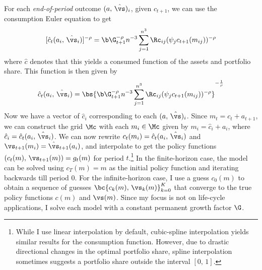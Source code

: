 For each \textit{end-of-period} outcome $(a,\,\hat{\vs})_i$, given $c_{t+1}$, we can use the consumption Euler equation to get
\[
[\hat{c}_t(a_i,\,\hat{\vs}_i)]^{-\rho} = \b\G_{t+1}^{-\rho} n^{-3}\sum_{j=1}^{n^3}\Rc_{ij}(\psi_{j}c_{t+1}(m_{ij}))^{-\rho}
\]
where $\hat{c}$ denotes that this yields a consumed function of the assets and portfolio share.
This function is then given by
\[
\hat{c}_{t}(a_i,\,\hat{\vs}_i) = \bs{\b\G_{t+1}^{-\rho}n^{-3}\sum_{j=1}^{n^3}\Rc_{ij}(\psi_{j}c_{t+1}(m_{ij}))^{-\rho}}^{-\frac{1}{\rho}}
\]
Now we have a vector of $\hat{c}_i$ corresponding to each $(a,\,\hat{\vs})_i$. Since $m_{t} = c_{t} + a_{t+1}$, we can construct the grid $\Mc$ with each $m_i \in \Mc$ given by $m_i = \hat{c}_i + a_i$, where $\hat{c}_{i} = \hat{c}_{t}(a_i,\,\hat{\vs}_i)$. We can now rewrite $c_t(m_i) = \hat{c}_t(a_i,\,\hat{\vs}_i)$ and $\vs_{t+1}(m_i) = \hat{\vs}_{t+1}(a_i)$, and interpolate to get the policy functions $(c_{t}(m),\,\vs_{t+1}(m)) = g_{t}(m)$ for period $t$.\footnote{While I use linear interpolation by default, cubic-spline interpolation yields similar results for the consumption function. However, due to drastic directional changes in the optimal portfolio share, spline interpolation sometimes suggests a portfolio share outside the interval $[0,\,1]$.} In the finite-horizon case, the model can be solved using $c_{T}(m) = m$ as the initial policy function and iterating backwards till period 0. For the infinite-horizon case, I use a guess $c_{0}(m)$ to obtain a sequence of guesses $\bc{c_{k}(m),\,\vs_{k}(m)}_{k=0}^{K}$ that converge to the true policy functions $c(m)$ and $\vs(m)$. Since my focus is not on life-cycle applications, I solve each model with a constant permanent growth factor $\G$.